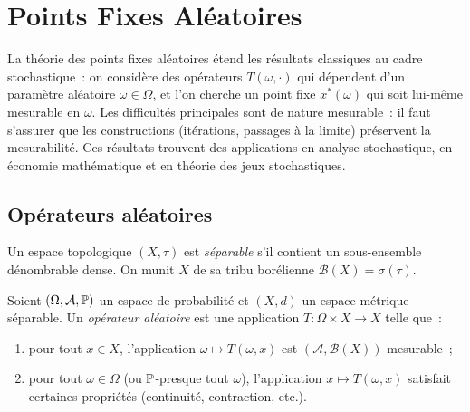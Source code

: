 \chapter{Points Fixes Al\'eatoires}
\label{ch:aleatoires}

\begin{intuition}
La th\'eorie des points fixes al\'eatoires \'etend les r\'esultats classiques au cadre
stochastique~: on consid\`ere des op\'erateurs $T(\omega, \cdot)$ qui d\'ependent d'un
param\`etre al\'eatoire $\omega \in \Omega$, et l'on cherche un point fixe $x^*(\omega)$
qui soit lui-m\^eme mesurable en $\omega$. Les difficult\'es principales sont de nature
mesurable~: il faut s'assurer que les constructions (it\'erations, passages \`a la limite)
pr\'eservent la mesurabilit\'e. Ces r\'esultats trouvent des applications en analyse
stochastique, en \'economie math\'ematique et en th\'eorie des jeux stochastiques.
\end{intuition}

\section{Op\'erateurs al\'eatoires}

\begin{definition}
Un espace topologique $(X, \tau)$ est \emph{s\'eparable} s'il contient un sous-ensemble
d\'enombrable dense. On munit $X$ de sa tribu bor\'elienne
$\mathcal{B}(X) = \sigma(\tau)$.
\end{definition}

\begin{definition}
Soient $(\Omega, \mathcal{A}, \mathbb{P})$ un espace de probabilit\'e et $(X, d)$ un espace
m\'etrique s\'eparable. Un \emph{op\'erateur al\'eatoire} est une application
$T\colon \Omega \times X \to X$ telle que~:
\begin{enumerate}
  \item pour tout $x \in X$, l'application $\omega \mapsto T(\omega, x)$ est
    $(\mathcal{A}, \mathcal{B}(X))$-mesurable~;
  \item pour tout $\omega \in \Omega$ (ou $\mathbb{P}$-presque tout $\omega$), l'application
    $x \mapsto T(\omega, x)$ satisfait certaines propri\'et\'es (continuit\'e, contraction,
    etc.).
\end{enumerate}
\end{definition}

